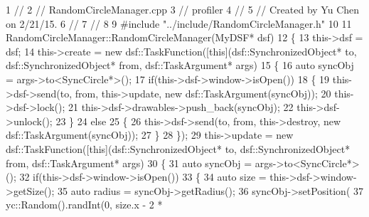 \begin{DoxyCodeInclude}
1 \textcolor{comment}{//}
2 \textcolor{comment}{//  RandomCircleManager.cpp}
3 \textcolor{comment}{//  profiler}
4 \textcolor{comment}{//}
5 \textcolor{comment}{//  Created by Yu Chen on 2/21/15.}
6 \textcolor{comment}{//}
7 \textcolor{comment}{//}
8 
9 \textcolor{preprocessor}{#include "../include/RandomCircleManager.h"}
10 
11 RandomCircleManager::RandomCircleManager(MyDSF* dsf)
12 \{
13     this->dsf = dsf;
14     this->create = \textcolor{keyword}{new} dsf::TaskFunction([\textcolor{keyword}{this}](dsf::SynchronizedObject* to, dsf::SynchronizedObject* from,
       dsf::TaskArgument* args)
15                                          \{
16                                              \textcolor{keyword}{auto} syncObj = args->to<SyncCircle*>();
17                                              \textcolor{keywordflow}{if}(this->dsf->window->isOpen())
18                                              \{
19                                                  this->dsf->send(to, from, this->update, \textcolor{keyword}{new} 
      dsf::TaskArgument(syncObj));
20                                                  this->dsf->lock();
21                                                  this->dsf->drawables->push\_back(syncObj);
22                                                  this->dsf->unlock();
23                                              \}
24                                              \textcolor{keywordflow}{else}
25                                              \{
26                                                  this->dsf->send(to, from, this->destroy, \textcolor{keyword}{new} 
      dsf::TaskArgument(syncObj));
27                                              \}
28                                          \});
29     this->update = \textcolor{keyword}{new} dsf::TaskFunction([\textcolor{keyword}{this}](dsf::SynchronizedObject* to, dsf::SynchronizedObject* from,
       dsf::TaskArgument* args)
30                                          \{
31                                              \textcolor{keyword}{auto} syncObj = args->to<SyncCircle*>();
32                                              \textcolor{keywordflow}{if}(this->dsf->window->isOpen())
33                                              \{
34                                                  \textcolor{keyword}{auto} size = this->dsf->window->getSize();
35                                                  \textcolor{keyword}{auto} radius = syncObj->getRadius();
36                                                  syncObj->setPosition(
37                                                                       yc::Random().randInt(0, size.x - 2 * 

\end{DoxyCodeInclude}
